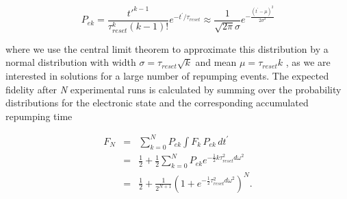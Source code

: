 \begin{equation}
P_{ek} = \frac{t'^{k-1}}{\tau_{reset}^k(k-1)! }e^{-t^{\prime}/\tau_{reset}} \approx \frac{1}{\sqrt{2\pi}\sigma}e^{-\frac{(t^{\prime}-\mu)^2}{2\sigma^2}}
\end{equation}


where we use the central limit theorem to approximate this distribution by a normal distribution with width $\sigma = \tau_{reset} \sqrt{k}$ and mean $\mu = \tau_{reset} k$ , as we are interested in solutions for a large number of repumping events. The expected fidelity after \textit{N} experimental runs is calculated by summing over the probability distributions for the electronic state and the corresponding accumulated repumping time

\begin{eqnarray}
F_N & = & \sum_{k=0}^N  P_{ek} \int F_k\, P_{ek}\, dt^{\prime} \nonumber \\
& = & \frac{1}{2} + \frac{1}{2} \sum_{k=0}^N P_{ek} e^{-\frac{1}{2}k\tau_{reset}^2 d \omega^2} \nonumber \\
& = & \frac{1}{2} + \frac{1}{2^{N+1}}\left(1 + e^{-\frac{1}{2}\tau_{reset}^2 d \omega^2}\right)^N.
\end{eqnarray}

\newpage




